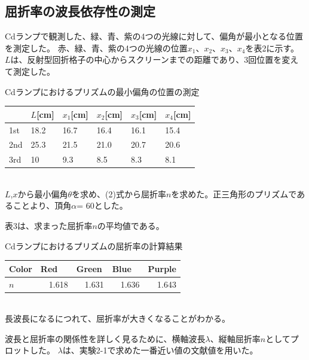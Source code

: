 \documentclass[a4paper,10pt]{jsarticle}
\makeatletter
\newenvironment{tablehere}
{\def\@captype{table}}
{}
\makeatother
\begin{document}
\begin{multicols}{2}
\subsection{屈折率の波長依存性の測定}
Cdランプで観測した、緑、青、紫の4つの光線に対して、偏角が最小となる位置を測定した。
赤、緑、青、紫の4つの光線の位置$x_1$、$x_2$、$x_3$、$x_4$を表2に示す。
$L$は、反射型回折格子の中心からスクリーンまでの距離であり、3回位置を変えて測定した。

\begin{tablehere}
  \centering
  \caption{Cdランプにおけるプリズムの最小偏角の位置の測定}
    \begin{tabular}{llllll}
    \toprule
          & $L$[cm]     & $x_1$[cm] & $x_2$[cm]& $x_3$[cm]& $x_4$[cm]\\
    \midrule
    1st & 18.2  & 16.7  & 16.4  & 16.1  & 15.4 \\
    2nd & 25.3  & 21.5  & 21.0    & 20.7  & 20.6 \\
    3rd & 10    & 9.3   & 8.5   & 8.3   & 8.1 \\
    \bottomrule
    \end{tabular}%
  \label{tab:addlabel}%
\end{tablehere}%
\\

$L$,$x$から最小偏角$\theta$を求め、(2)式から屈折率$n$を求めた。正三角形のプリズムであることより、頂角$\alpha$= 60とした。

表3は、求まった屈折率$n$の平均値である。

\begin{tablehere}
  \centering
  \caption{Cdランプにおけるプリズムの屈折率の計算結果}
    \centering
    \begin{tabular}{lrrrr}
    \toprule
    Color & \multicolumn{1}{l}{Red} & \multicolumn{1}{l}{Green} & \multicolumn{1}{l}{Blue} & \multicolumn{1}{l}{Purple} \\
    \midrule
    $n$ & 1.618　& 1.631　& 1.636　& 1.643　\\
    \bottomrule
    \end{tabular}%
  \label{tab:addlabel}%
\end{tablehere}%
\\

長波長になるにつれて、屈折率が大きくなることがわかる。

波長と屈折率の関係性を詳しく見るために、横軸波長$\lambda$、縦軸屈折率$n$としてプロットした。
$\lambda$は、実験2-1で求めた一番近い値の文献値を用いた。


\end{multicols}
\end{document}
